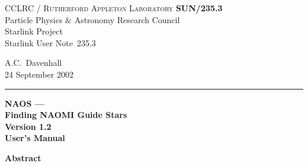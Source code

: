 \documentclass[twoside,11pt]{article}
\newcommand{\NAOSversion}{1.2~}
\newcommand{\stardoccategory}  {Starlink User Note}
\newcommand{\stardocinitials}  {SUN}
\newcommand{\stardocnumber}    {235.3}
\newcommand{\stardocauthors}   {A.C.~Davenhall}
\newcommand{\stardocdate}      {24 September 2002}
\newcommand{\stardoctitle}     {NAOS --- \\ Finding NAOMI Guide Stars}
\newcommand{\stardocversion}   {Version \NAOSversion}
\newcommand{\stardocmanual}    {User's Manual}
\newcommand{\stardocname}{\stardocinitials /\stardocnumber}
\newenvironment{latexonly}{}{}
\renewcommand{\_}{\texttt{\symbol{95}}}
\begin{document}
\thispagestyle{empty}

\begin{latexonly}
   CCLRC / \textsc{Rutherford Appleton Laboratory} \hfill \textbf{\stardocname}\\
   {\large Particle Physics \& Astronomy Research Council}\\
   {\large Starlink Project\\}
   {\large \stardoccategory\ \stardocnumber}
   \begin{flushright}
   \stardocauthors\\
   \stardocdate
   \end{flushright}
   \vspace{-4mm}
   \rule{\textwidth}{0.5mm}
   \vspace{5mm}
   \begin{center}
   {\Huge\textbf{\stardoctitle \\ [2.5ex]}}
   {\LARGE\textbf{\stardocversion \\ [4ex]}}
   {\Huge\textbf{\stardocmanual}}
   \end{center}
   \vspace{5mm}


   \vspace{10mm}
   \begin{center}
      {\Large\textbf{Abstract}}
   \end{center}
\end{latexonly}
\end{document}
